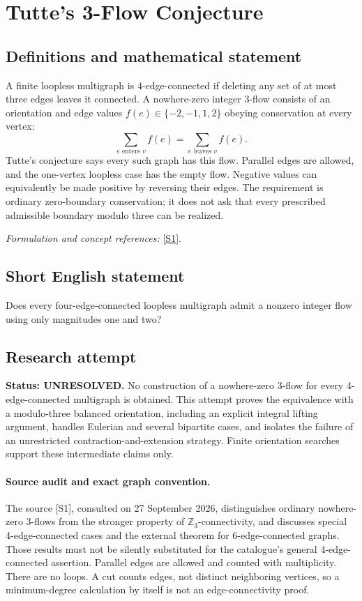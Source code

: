 \documentclass[11pt]{article}
\begin{document}
\section*{\texorpdfstring{Tutte's 3-Flow Conjecture}{Tutte's 3-Flow Conjecture}}\label{350}
\subsection{Definitions and mathematical statement}
A finite loopless multigraph is $4$-edge-connected if deleting any set of at most three edges leaves it connected. A nowhere-zero integer $3$-flow consists of an orientation and edge values $f(e)\in\{-2,-1,1,2\}$ obeying conservation at every vertex:
\[
 \sum_{e\text{ enters }v} f(e)=\sum_{e\text{ leaves }v}f(e).
\]
Tutte's conjecture says every such graph has this flow. Parallel edges are allowed, and the one-vertex loopless case has the empty flow. Negative values can equivalently be made positive by reversing their edges. The requirement is ordinary zero-boundary conservation; it does not ask that every prescribed admissible boundary modulo three can be realized.
\par\smallskip\textit{Formulation and concept references:} \href{https://arxiv.org/pdf/1406.1554}{[S1]}.

\subsection{Short English statement}
Does every four-edge-connected loopless multigraph admit a nonzero integer flow using only magnitudes one and two?
\subsection{Research attempt}
\textbf{Status: UNRESOLVED.} No construction of a nowhere-zero 3-flow for every 4-edge-connected multigraph is obtained. This attempt proves the equivalence with a modulo-three balanced orientation, including an explicit integral lifting argument, handles Eulerian and several bipartite cases, and isolates the failure of an unrestricted contraction-and-extension strategy. Finite orientation searches support these intermediate claims only.

\paragraph{Source audit and exact graph convention.}
The source [S1], consulted on 27 September 2026, distinguishes ordinary nowhere-zero 3-flows from the stronger property of $\mathbb Z_3$-connectivity, and discusses special 4-edge-connected cases and the external theorem for 6-edge-connected graphs. Those results must not be silently substituted for the catalogue's general 4-edge-connected assertion. Parallel edges are allowed and counted with multiplicity. There are no loops. A cut counts edges, not distinct neighboring vertices, so a minimum-degree calculation by itself is not an edge-connectivity proof.
\end{document}
